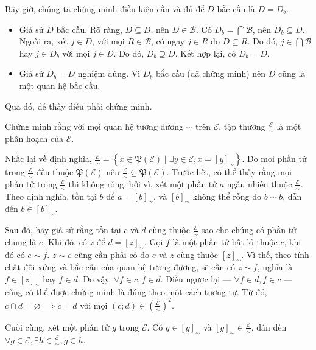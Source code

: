 Bây giờ, chúng ta chứng minh điều kiện cần và đủ để $D$ bắc cầu là $D = D_b$.
\begin{itemize}
   \item Giả sử $D$ bắc cầu. Rõ ràng, $D \subseteq D$, nên $D \in \mathcal{B}$. Có $D_b = \bigcap \mathcal{B}$, nên $D_b \subseteq D$. Ngoài ra, xét $j \in D$, với mọi $R \in \mathcal{B}$, có ngay $j \in R$ do $D \subseteq R$. Do đó, $j \in \bigcap \mathcal{B}$ hay $j \in D_b$ với mọi $j \in D$. Do đó, $D_b \supseteq D$. Kết hợp lại, có $D_b = D$.
   \item Giả sử $D_b = D$ nghiệm đúng. Vì $D_b$ bắc cầu (đã chứng minh) nên $D$ cũng là một quan hệ bắc cầu.
\end{itemize}

Qua đó, dễ thấy điều phải chứng minh.

 Chứng minh rằng với mọi quan hệ tương đương $\sim$ trên $\mathscr{E}$, tập thương $\frac{\mathscr{E}}{\sim}$ là một phân hoạch của $\mathscr{E}$.


Nhắc lại về định nghĩa, $\frac{\mathscr{E}}{\sim} = \left\{x \in \mathfrak{P}(\mathscr{E}) \mid \exists y \in \mathscr{E}, x = [y]_\sim\right\}$. Do mọi phần tử trong $\frac{\mathscr{E}}{\sim}$ đều thuộc $\mathfrak{P}(\mathscr{E})$ nên $\frac{\mathscr{E}}{\sim} \subseteq \mathfrak{P}(\mathscr{E})$. Trước hết, có thể thấy rằng mọi phần tử trong $\frac{\mathscr{E}}{\sim}$ thì không rỗng, bởi vì, xét một phần tử $a$ ngẫu nhiên thuộc $\frac{\mathscr{E}}{\sim}$. Theo định nghĩa, tồn tại $b$ để $a = [b]_\sim$, và $[b]_\sim$ không thể rỗng do $b \sim b$, dẫn đến $b \in [b]_\sim$.

Sau đó, hãy giả sử rằng tồn tại $c$ và $d$ cùng thuộc $\frac{\mathscr{E}}{\sim}$ sao cho chúng có phần tử chung là $e$. Khi đó, có $z$ để $d = [z]_\sim$. Gọi $f$ là một phần tử bất kì thuộc $c$, khi đó có $e \sim f$. $z \sim e$ cũng cần phải có do $e$ và $z$ cùng thuộc $[z]_\sim$. Vì thế, theo tính chất đối xứng và bắc cầu của quan hệ tương đương, sẽ cần có $z \sim f$, nghĩa là $f \in [z]_\sim$ hay $f \in d$. Do vậy, $\forall f \in c, f \in d.$ 
Điều ngược lại --- $\forall f \in d, f\in c$ --- cũng có thể được chứng minh là đúng theo một cách tương tự. Từ đó, $c \cap d = \varnothing \implies c = d$ với mọi $(c; d) \in \left(\frac{\mathscr{E}}{\sim}\right)^2$.

Cuối cùng, xét một phần tử $g$ trong $\mathscr{E}$. Có $g \in [g]_\sim$ và $[g]_\sim \in \frac{\mathscr{E}}{\sim}$, dẫn đến $\forall g \in \mathscr{E}, \exists h \in \frac{\mathscr{E}}{\sim}, g \in h$.

